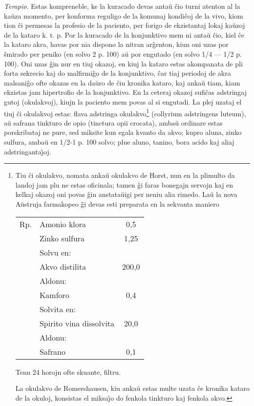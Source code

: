 {\sl Terapio.} Estas kompreneble, ke la kuracado devas anta\u u
\^cio turni atenton al la ka\u uza momento, per konforma reguligo de
la komunaj kondi\^coj de la vivo, kiom tion \^ci permesas la
profesio de la paciento, per forigo de ekzistantaj lokaj ka\u uzoj
de la kataro k. t. p. Por la kuracado de la konjunktivo mem ni
anta\u u \^cio, kiel \^ce la kataro akra, havas por nia dispono la
nitran ar\^genton, kiun oni uzas por \^smirado per peniko (en solvo
2 p. 100) a\u u por engutado (en solvo 1/4 --- 1/2 p. 100). Oni uzas
\^gin nur en tiuj okazoj, en kiuj la kataro estas akompanata de pli
forta sekrecio kaj do malfirmi\^go de la konjunktivo, \^car tiaj
periodoj de akra malsani\^go ofte okazas en la da\u uro de \^ciu
kronika kataro, kaj anka\u u tiam, kiam ekzistas jam hipertrofio de
la konjunktivo. En la ceteraj okazoj sufi\^cas adstringaj gutoj
(okulakvoj), kiujn la paciento mem povas al si engutadi. La plej
uzataj el tiuj \^ci okulakvoj estas: flava adstringa okulakvo\footnote{
Tiu \^ci okulakvo, nomata anka\u u okulakvo de Horst, nun en la plimulto 
da landoj jam plu ne estas oficinala; tamen \^gi faras bonegajn servojn 
kaj en kelkaj okazoj oni povas \^gin anstata\u uigi per neniu alia rimedo.
La\u u la nova A\u ustruja farmakopeo \^gi devas esti preparata en la
sekvanta maniero
\begin{center}
\begin{tabu} to 0.7
Rp. & Amonio klora \dotfill & 0,5\\
 & Zinko sulfura  \dotfill & 1,25\\
 & \hspace*{1cm}Solvu en: &  \\
 &  Akvo distilita \dotfill & 200,0\\
 & \hspace*{1cm}Aldonu: &  \\
 &  Kamforo \dotfill & 0,4\\
 & \hspace*{1cm}Solvita en: &   \\
 & Spirito vina dissolvita \dotfill & 20,0\\
 & \hspace*{1cm}Aldonu: & \\
 &  Safrano \dotfill & 0,1\\
\end{tabu}

Tenu 24 horojn ofte skuante, filtru.\par
\end{center}
La okulakvo de Romershausen, kiu anka\u u estas multe uzata \^ce
kronika kataro de la okuloj, konsistas el miksa\^{\j}o do fenkola
tinkturo kaj fenkola akvo.} (collyrium adstringens luteum), a\u u safrana tinkturo de opio
(tinctura opii crocata), amba\u u ordinare estas porskribataj ne
pure, sed miksite kun egala kvanto da akvo; kupro aluna, zinko
sulfura, amba\u u en 1/2-1 p. 100 solvo; plue aluno, tanino, bora
acido kaj aliaj adstringanta\^{\j}oj.

